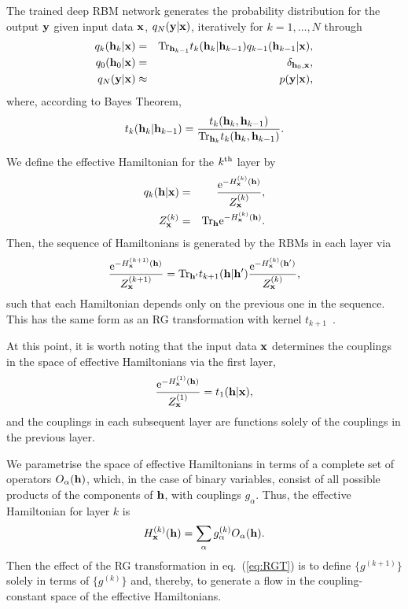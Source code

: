 \documentclass[reprint,amsmath,amssymb,aps]{revtex4-1}
\begin{document}
The trained deep RBM network generates the probability distribution for the output $\bf y$ given input data $\bf x$, $q_N({\bf y}|{\bf x})$, iteratively for $k=1,\ldots,N$ through
\begin{eqnarray}
q_k({\bf h}_k|{\bf x}) &=& {\rm Tr}_{{\bf h}_{k-1}}t_k({\bf h}_k|{\bf h}_{k-1})q_{k-1}({\bf h}_{k-1}|{\bf x}),\nonumber\\
q_0({\bf h}_0|{\bf x}) &=& \delta_{{\bf h}_0, {\bf x}},\nonumber\\
q_N({\bf y}|{\bf x}) &\approx& p({\bf y}|{\bf x}),
\label{eq:deepRBMprob}
\end{eqnarray}
where, according to Bayes Theorem,
\begin{equation}
t_k({\bf h}_k|{\bf h}_{k-1}) = \frac{t_k({\bf h}_k, {\bf h}_{k-1})}{{\rm Tr}_{{\bf h}_{k}}t_k({\bf h}_k,{\bf h}_{k-1})}.
\end{equation}

We define the effective Hamiltonian for the $k^{\rm th}$ layer by
\begin{eqnarray}
q_k({\bf h}|{\bf x}) &=& \frac{{\rm e}^{-H^{(k)}_{\bf x}({\bf h})}}{Z^{(k)}_{\bf x}},\nonumber\\
Z^{(k)}_{\bf x} &=& {\rm Tr}_{\bf h} {\rm e}^{-H^{(k)}_{\bf x}({\bf h})}.
\label{eq:Hamiltonian}
\end{eqnarray}
Then, the sequence of Hamiltonians is generated by the RBMs in each layer via
\begin{equation}
\frac{{\rm e}^{-H^{(k+1)}_{\bf x}({\bf h})}}{Z^{(k+1)}_{\bf x}} = {\rm Tr}_{{\bf h}'}t_{k+1}({\bf h}|{\bf h}')\frac{{\rm e}^{-H^{(k)}_{\bf x}({\bf h}')}}{Z^{(k)}_{\bf x}},
\label{eq:RGT}
\end{equation}
such that each Hamiltonian depends only on the previous one in the sequence. This has the same form as an RG transformation with kernel $t_{k+1}$~\cite{MehtaSchwab2014}.

At this point, it is worth noting that the input data $\bf x$ determines the couplings in the space of effective Hamiltonians via the first layer,
\begin{equation}
\frac{{\rm e}^{-H^{(1)}_{\bf x}({\bf h})}}{Z^{(1)}_{\bf x}} = t_1({\bf h}|{\bf x}),
\label{eq:first layer}
\end{equation}
and the couplings in each subsequent layer are functions solely of the couplings in the previous layer.

We parametrise the space of effective Hamiltonians in terms of a complete set of operators $O_\alpha({\bf h})$, which, in the case of binary variables, consist of all possible products of the components of ${\bf h}$, with couplings $g_\alpha$. Thus, the effective Hamiltonian for layer $k$ is
\begin{equation}
H^{(k)}_{\bf x}({\bf h}) = \sum_\alpha{g^{(k)}_\alpha O_\alpha({\bf h})}.
\label{eq:couplings}
\end{equation}
Then the effect of the RG transformation in eq.~(\ref{eq:RGT}) is to define $\{g^{(k+1)}\}$ solely in terms of $\{g^{(k)}\}$ and, thereby, to generate a flow in the coupling-constant space of the effective Hamiltonians.
\end{document}
